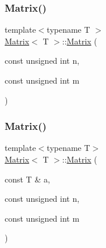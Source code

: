 \mbox{\label{classMatrix_ac8061527f81abb94e19b1ac6fd4af63a_ac8061527f81abb94e19b1ac6fd4af63a}} 
\subsubsection{\texorpdfstring{Matrix()}{Matrix()}\hspace{0.1cm}{\footnotesize\ttfamily [2/7]}}
{\footnotesize\ttfamily template$<$typename T $>$ \\
\mbox{\hyperlink{classMatrix}{Matrix}}$<$ T $>$\+::\mbox{\hyperlink{classMatrix}{Matrix}} (\begin{DoxyParamCaption}\item[{const unsigned int}]{n,  }\item[{const unsigned int}]{m }\end{DoxyParamCaption})}

\mbox{\label{classMatrix_a697e01f8d46c2059d0420d5b420efb91_a697e01f8d46c2059d0420d5b420efb91}} 
\subsubsection{\texorpdfstring{Matrix()}{Matrix()}\hspace{0.1cm}{\footnotesize\ttfamily [3/7]}}
{\footnotesize\ttfamily template$<$typename T$>$ \\
\mbox{\hyperlink{classMatrix}{Matrix}}$<$ T $>$\+::\mbox{\hyperlink{classMatrix}{Matrix}} (\begin{DoxyParamCaption}\item[{const T \&}]{a,  }\item[{const unsigned int}]{n,  }\item[{const unsigned int}]{m }\end{DoxyParamCaption})}

\mbox{\label{classMatrix_a991881e660607b10ff4fbf705006108d_a991881e660607b10ff4fbf705006108d}} 
